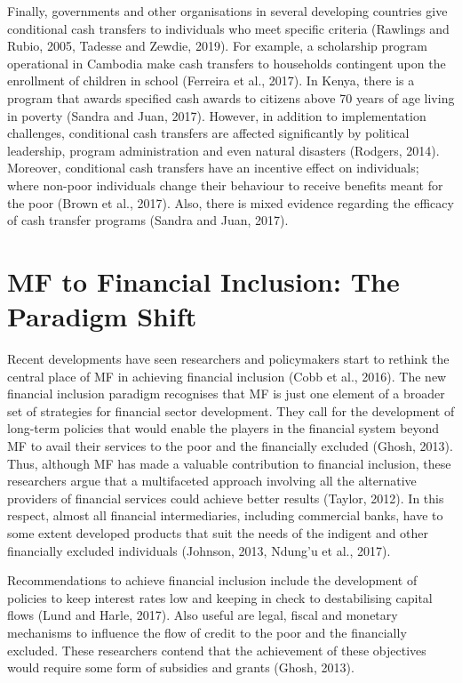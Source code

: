 \documentclass[a4paper, nobind]{templates/ociamthesis}
\begin{document}
Finally, governments and other organisations in several developing countries give conditional cash transfers to individuals who meet specific criteria (Rawlings and Rubio, 2005, Tadesse and Zewdie, 2019). For example, a scholarship program operational in Cambodia make cash transfers to households contingent upon the enrollment of children in school (Ferreira et al., 2017). In Kenya, there is a program that awards specified cash awards to citizens above 70 years of age living in poverty (Sandra and Juan, 2017). However, in addition to implementation challenges, conditional cash transfers are affected significantly by political leadership, program administration and even natural disasters (Rodgers, 2014). Moreover, conditional cash transfers have an incentive effect on individuals; where non-poor individuals change their behaviour to receive benefits meant for the poor (Brown et al., 2017). Also, there is mixed evidence regarding the efficacy of cash transfer programs (Sandra and Juan, 2017).

\hypertarget{mf-to-financial-inclusion-the-paradigm-shift}{%
\section{MF to Financial Inclusion: The Paradigm Shift}\label{mf-to-financial-inclusion-the-paradigm-shift}}

\noindent Recent developments have seen researchers and policymakers start to rethink the central place of MF in achieving financial inclusion (Cobb et al., 2016). The new financial inclusion paradigm recognises that MF is just one element of a broader set of strategies for financial sector development. They call for the development of long-term policies that would enable the players in the financial system beyond MF to avail their services to the poor and the financially excluded (Ghosh, 2013). Thus, although MF has made a valuable contribution to financial inclusion, these researchers argue that a multifaceted approach involving all the alternative providers of financial services could achieve better results (Taylor, 2012). In this respect, almost all financial intermediaries, including commercial banks, have to some extent developed products that suit the needs of the indigent and other financially excluded individuals (Johnson, 2013, Ndung'u et al., 2017).

Recommendations to achieve financial inclusion include the development of policies to keep interest rates low and keeping in check to destabilising capital flows (Lund and Harle, 2017). Also useful are legal, fiscal and monetary mechanisms to influence the flow of credit to the poor and the financially excluded. These researchers contend that the achievement of these objectives would require some form of subsidies and grants (Ghosh, 2013).
\end{document}
